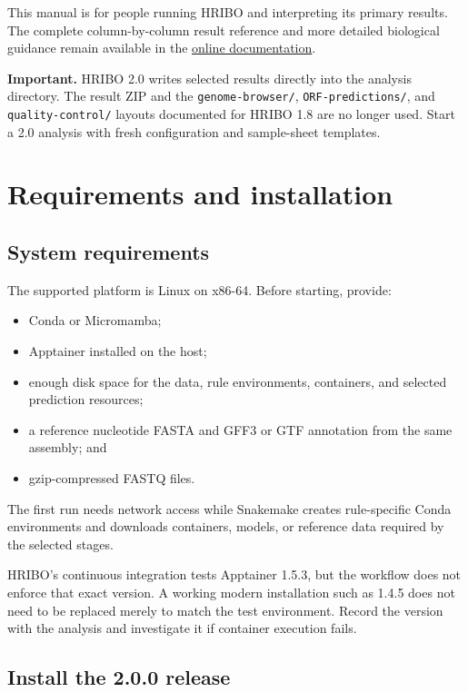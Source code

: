 \documentclass[11pt,a4paper]{article}
\newcommand{\file}[1]{\nolinkurl{#1}}
\newcommand{\important}[1]{%
  \par\smallskip
  \noindent\colorbox{hriboLight}{%
    \parbox{\dimexpr\linewidth-2\fboxsep\relax}{\textbf{Important.} #1}}%
  \par\smallskip
}
\begin{document}
This manual is for people running HRIBO and interpreting its primary results.
The complete column-by-column result reference and more detailed biological
guidance remain available in the
\href{https://hribo.readthedocs.io/en/stable/}{online documentation}.

\important{HRIBO 2.0 writes selected results directly into the analysis
directory. The result ZIP and the \file{genome-browser/},
\file{ORF-predictions/}, and \file{quality-control/} layouts documented for
HRIBO 1.8 are no longer used. Start a 2.0 analysis with fresh configuration
and sample-sheet templates.}

\section{Requirements and installation}

\subsection{System requirements}

The supported platform is Linux on x86-64. Before starting, provide:

\begin{itemize}
  \item Conda or Micromamba;
  \item Apptainer installed on the host;
  \item enough disk space for the data, rule environments, containers, and
        selected prediction resources;
  \item a reference nucleotide FASTA and GFF3 or GTF annotation from the same
        assembly; and
  \item gzip-compressed FASTQ files.
\end{itemize}

The first run needs network access while Snakemake creates rule-specific Conda
environments and downloads containers, models, or reference data required by
the selected stages.

HRIBO's continuous integration tests Apptainer 1.5.3, but the workflow does
not enforce that exact version. A working modern installation such as 1.4.5
does not need to be replaced merely to match the test environment. Record the
version with the analysis and investigate it if container execution fails.

\subsection{Install the 2.0.0 release}
\end{document}
